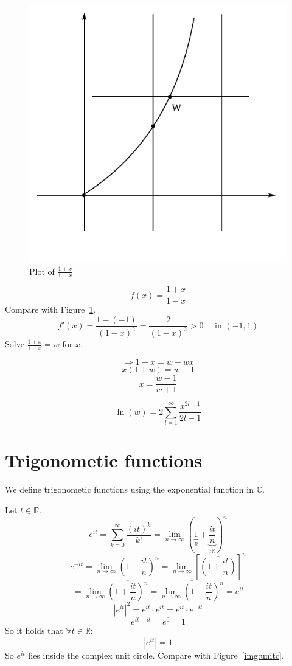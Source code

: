 \documentclass[a4paper,landscape,twocolumn]{article}
\theoremstyle{definition}
\newcommand\abs[1]{\left|#1\right|}
\begin{document}
\begin{figure}[!h]
  \begin{center}
    \includegraphics{img/1x_1-x.pdf}
    \caption{Plot of $\frac{1+x}{1-x}$}
    \label{img:1x-1x}
  \end{center}
\end{figure}

\[ f(x) = \frac{1 + x}{1 - x} \]
Compare with Figure~\ref{img:1x-1x}.
\[ f'(x) = \frac{1 - (-1)}{(1 - x)^2} = \frac{2}{(1 - x)^2} > 0 \quad \text{ in } (-1, 1) \]
Solve $\frac{1 + x}{1 - x} = w$ for $x$.

\[ \Rightarrow 1 + x  = w - wx \]
\[ x (1 + w) = w - 1 \]
\[ x = \frac{w - 1}{w + 1} \]

\[ \ln(w) = 2 \sum_{l=1}^\infty \frac{x^{2l-1}}{2l - 1} \]

\section{Trigonometic functions}

We define trigonometic functions using the exponential function in $\mathbb C$.

Let $t \in \mathbb R$.
\[ e^{it} = \sum_{k=0}^\infty \frac{(it)^k}{k!} = \lim_{n\to\infty} \left(\underbrace{1}_{\mathbb R} + \underbrace{\frac{it}{n}}_{i \mathbb R}\right)^n \]
\[
  e^{-it}
    = \lim_{n\to\infty} \left(1 - \frac{it}{n}\right)^n
    = \lim_{n\to\infty} \left[\overline{\left(1 + \frac{it}{n}\right)}\right]^n
\] \[
  = \lim_{n\to\infty} \overline{\left(1 + \frac{it}{n}\right)^n}
  = \overline{\lim_{n\to\infty} \left(1 + \frac{it}{n}\right)^n}
  = e^{it}
\] \[
  \abs{e^{it}}^2 = e^{it} \cdot \overline{e^{it}} = e^{it} \cdot e^{-it}
\] \[
  e^{it - it} = e^0 = 1
\]
So it holds that $\forall t \in \mathbb R$:
\[ \abs{e^{it}} = 1 \]
So $e^{it}$ lies inside the complex unit circle. Compare with Figure~\ref{img:unitc}.
\end{document}
